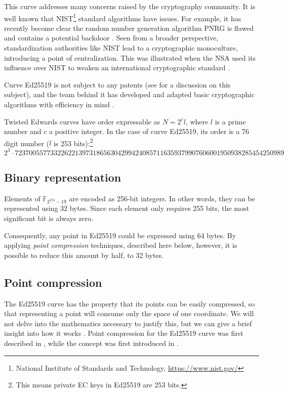 This curve addresses many concerns raised by the cryptography community. It is well known that NIST\footnote{\label{NIST_note}National Institute of Standards and Technology, \url{https://www.nist.gov/}} 
standard algorithms have issues. For example, it has recently become clear the random number generation algorithm PNRG is flawed and contains a potential backdoor \cite{hales2014nsa}. Seen from a broader perspective, standardization authorities like NIST lead to a cryptographic monoculture, introducing a point of centralization. This was illustrated when the NSA used its influence over NIST to weaken an international cryptographic standard \cite{NSA-NIST}.

Curve Ed25519 is not subject to any patents (see \cite{ECC-patents} for a discussion on this subject), and the team behind it has
developed and adapted basic cryptographic algorithms with efficiency in mind \cite{Bernstein2007}.

Twisted Edwards curves have order expressable as \(N=2^c l\), where \(l\) is a prime number and \(c\) a positive integer. In the case of curve Ed25519, its order is a 76 digit number ($l$ is 253 bits):\footnote{This means private EC keys in Ed25519 are 253 bits.}\vspace{.2cm}
\[2^3 \cdot 7237005577332262213973186563042994240857116359379907606001950938285454250989\]


\subsection{Binary representation}
\label{binary_note}
Elements of \(\mathbb{F}_{2^{255} - 19} \) are encoded as 256-bit integers. In other words, they can be represented using 32 bytes. Since each element only requires 255 bits, the most significant bit is always zero.

Consequently, any point in Ed25519 could be expressed using 64 bytes. By applying {\em point compression} techniques, described here below, however, it is possible to reduce this amount by half, to 32 bytes.


\subsection{Point compression}
\label{point_compression_section}

The Ed25519 curve has the property that its points can be easily compressed, so that representing a point will consume only the space of one coordinate. We will not delve into the mathematics necessary to justify this, but we can give a brief insight into how it works \cite{eddsa-ed25519-irtf}. Point compression for the Ed25519 curve was first described in \cite{Bernstein2012}, while the concept was first introduced in \cite{Miller:point-compression-origin}.

